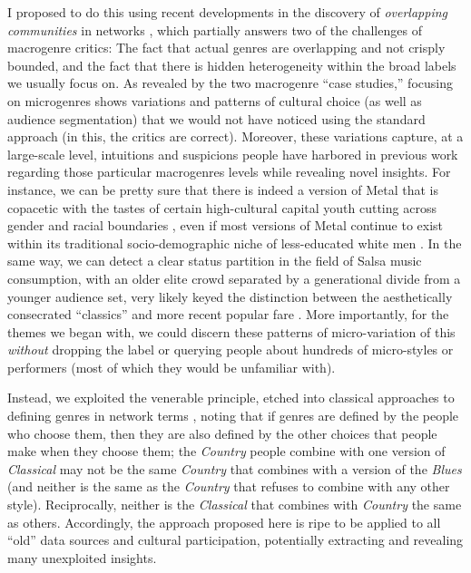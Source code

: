 \documentclass[a4paper,12pt]{extarticle}
\begin{document}
I proposed to do this using recent developments in the discovery of \textit{overlapping communities} in networks \citep{ahn_etal10}, which partially answers two of the challenges of macrogenre critics: The fact that actual genres are overlapping and not crisply bounded, and the fact that there is hidden heterogeneity within the broad labels we usually focus on. As revealed by the two macrogenre ``case studies,'' focusing on microgenres shows variations and patterns of cultural choice (as well as audience segmentation) that we would not have noticed using the standard approach (in this, the critics are correct). Moreover, these variations capture, at a large-scale level, intuitions and suspicions people have harbored in previous work regarding those particular macrogenres levels while revealing novel insights. For instance, we can be pretty sure that there is indeed a version of Metal that is copacetic with the tastes of certain high-cultural capital youth cutting across gender and racial boundaries \citep{tampubolon2008revisiting}, even if most versions of Metal continue to exist within its traditional socio-demographic niche of less-educated white men \citep{bryson96}. In the same way, we can detect a clear status partition in the field of Salsa music consumption, with an older elite crowd separated by a generational divide from a younger audience set, very likely keyed the distinction between the aesthetically consecrated ``classics'' and more recent popular fare \citep{Bachmayer2014-pk}. More importantly, for the themes we began with, we could discern these patterns of micro-variation of this \textit{without} dropping the label or querying people about hundreds of micro-styles or performers (most of which they would be unfamiliar with). 

Instead, we exploited the venerable principle, etched into classical approaches to defining genres in network terms \citep{dimaggio1987classification}, noting that if genres are defined by the people who choose them, then they are also defined by the other choices that people make when they choose them; the \textit{Country} people combine with one version of \textit{Classical} may not be the same \textit{Country} that combines with a version of the \textit{Blues} (and neither is the same as the \textit{Country} that refuses to combine with any other style). Reciprocally, neither is the \textit{Classical} that combines with \textit{Country} the same as others. Accordingly, the approach proposed here is ripe to be applied to all ``old'' data sources and cultural participation, potentially extracting and revealing many unexploited insights. 
\end{document}

